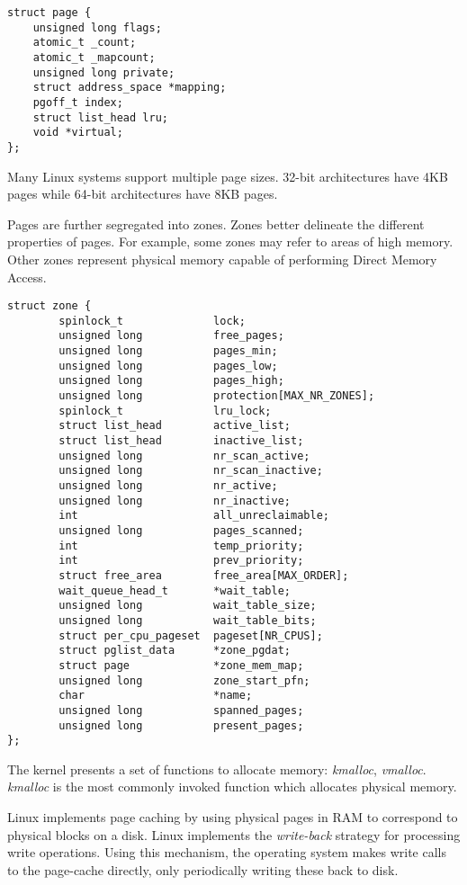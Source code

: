 \documentclass[onecolumn,10pt]{IEEETran}
\begin{document}
\begin{lstlisting}
struct page {
	unsigned long flags;
	atomic_t _count;
	atomic_t _mapcount;
	unsigned long private;
	struct address_space *mapping;
	pgoff_t index;
	struct list_head lru;
	void *virtual;
};
\end{lstlisting}

Many Linux systems support multiple page sizes.  32-bit architectures have 4KB pages while 64-bit architectures have 8KB pages.

Pages are further segregated into zones.  Zones better delineate the different properties of pages.  For example, some zones may refer to areas of high memory.  Other zones represent physical memory capable of performing Direct Memory Access\cite{lkd}.

\begin{lstlisting}
struct zone {
        spinlock_t              lock;
        unsigned long           free_pages;
        unsigned long           pages_min;
        unsigned long           pages_low;
        unsigned long           pages_high;
        unsigned long           protection[MAX_NR_ZONES];
        spinlock_t              lru_lock;
        struct list_head        active_list;
        struct list_head        inactive_list;
        unsigned long           nr_scan_active;
        unsigned long           nr_scan_inactive;
        unsigned long           nr_active;
        unsigned long           nr_inactive;
        int                     all_unreclaimable;
        unsigned long           pages_scanned;
        int                     temp_priority;
        int                     prev_priority;
        struct free_area        free_area[MAX_ORDER];
        wait_queue_head_t       *wait_table;
        unsigned long           wait_table_size;
        unsigned long           wait_table_bits;
        struct per_cpu_pageset  pageset[NR_CPUS];
        struct pglist_data      *zone_pgdat;
        struct page             *zone_mem_map;
        unsigned long           zone_start_pfn;
        char                    *name;
        unsigned long           spanned_pages;
        unsigned long           present_pages;
};
\end{lstlisting}

The kernel presents a set of functions to allocate memory: \textit{kmalloc}, \textit{vmalloc}. \textit{kmalloc} is the most commonly invoked function which allocates physical memory.

Linux implements page caching by using physical pages in RAM to correspond to physical blocks on a disk.  Linux implements the \textit{write-back} strategy for processing write operations.  Using this mechanism, the operating system makes write calls to the page-cache directly, only periodically writing these back to disk.
\end{document}
